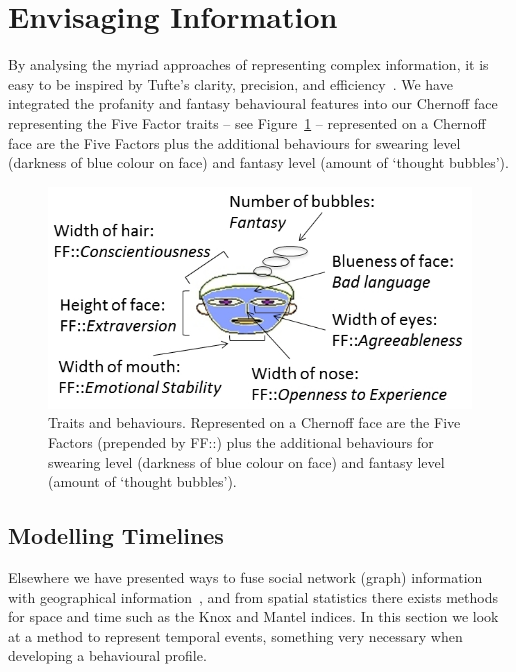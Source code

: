 \documentclass{AISB2008}
\begin{document}
\section{Envisaging Information}

By analysing the myriad approaches of representing complex
information, it is easy to be inspired by Tufte's clarity, precision,
and efficiency~\cite{tufte:2001,tufte:1997,tufte:1990}. We have
integrated the profanity and fantasy behavioural features into our
Chernoff face representing the Five Factor traits -- see
Figure~\ref{fig:blueface} -- represented on a Chernoff face are the
Five Factors plus the additional behaviours for swearing level
(darkness of blue colour on face) and fantasy level (amount of
`thought bubbles').

\begin{figure}[!htb]
\centering
\includegraphics[width=\columnwidth]{images/chernoffnew.jpg}
\caption{Traits and behaviours. Represented on a Chernoff face are the
  Five Factors (prepended by FF::) plus the additional behaviours for
  swearing level (darkness of blue colour on face) and fantasy level
  (amount of `thought bubbles').}
\label{fig:blueface}
\end{figure}


\subsection{Modelling Timelines}

Elsewhere we have presented ways to fuse social network (graph)
information with geographical
information~\cite{oatley-et-al:2006,oatley+crick-gisruk2015}, and from
spatial statistics there exists methods for space and time such as the
Knox and Mantel indices. In this section we look at a method to
represent temporal events, something very necessary when developing a
behavioural profile.
\end{document}
